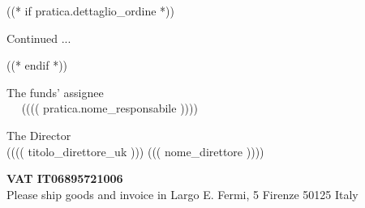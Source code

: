\documentclass[a4paper,12pt]{letter}
\begin{document}
((* if pratica.dettaglio_ordine *))
\vspace{0.5cm}
\begin{flushright}
Continued ...
\end{flushright}
\newpage
\vspace{2cm}
\quad
((* endif *))

\vspace{1cm}


\begin{minipage}{\textwidth}
\begin{minipage}[t]{8cm}
\begin{center}
The funds' assignee \\
~~ ({}((( pratica.nome_responsabile )))) ~~ \\
\end{center}
\end{minipage}\hfill\begin{minipage}[t]{8cm}
\begin{center}
The Director \\
({}((( titolo_direttore_uk ))) ((( nome_direttore )))) \\
\end{center}
\end{minipage}
\begin{center}
\vspace{14mm}

{\small\bf VAT IT06895721006} \\
{\small Please ship goods and invoice in Largo E. Fermi, 5 Firenze 50125 Italy}
\end{center}
\end{minipage}
\end{document}

